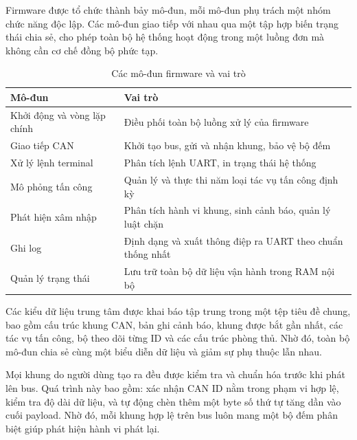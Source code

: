 
Firmware được tổ chức thành bảy mô-đun, mỗi mô-đun phụ trách một nhóm chức năng
độc lập. Các mô-đun giao tiếp với nhau qua một tập hợp biến trạng thái chia sẻ,
cho phép toàn bộ hệ thống hoạt động trong một luồng đơn mà không cần cơ chế đồng
bộ phức tạp.

\begin{table}[H]
\centering
\begin{tabular}{|>{\raggedright\arraybackslash}p{5cm}|>{\raggedright\arraybackslash}p{8.5cm}|}
\hline
\textbf{Mô-đun} & \textbf{Vai trò} \\ \hline
Khởi động và vòng lặp chính & Điều phối toàn bộ luồng xử lý của firmware \\ \hline
Giao tiếp CAN & Khởi tạo bus, gửi và nhận khung, bảo vệ bộ đếm \\ \hline
Xử lý lệnh terminal & Phân tích lệnh UART, in trạng thái hệ thống \\ \hline
Mô phỏng tấn công & Quản lý và thực thi năm loại tác vụ tấn công định kỳ \\ \hline
Phát hiện xâm nhập & Phân tích hành vi khung, sinh cảnh báo, quản lý luật chặn \\ \hline
Ghi log & Định dạng và xuất thông điệp ra UART theo chuẩn thống nhất \\ \hline
Quản lý trạng thái & Lưu trữ toàn bộ dữ liệu vận hành trong RAM nội bộ \\ \hline
\end{tabular}
\caption{Các mô-đun firmware và vai trò}
\end{table}

Các kiểu dữ liệu trung tâm được khai báo tập trung trong một tệp tiêu đề chung, bao
gồm cấu trúc khung CAN, bản ghi cảnh báo, khung được bắt gần nhất, các tác vụ tấn
công, bộ theo dõi từng ID và các cấu trúc phòng thủ. Nhờ đó, toàn bộ mô-đun chia
sẻ cùng một biểu diễn dữ liệu và giảm sự phụ thuộc lẫn nhau.


Mọi khung do người dùng tạo ra đều được kiểm tra và chuẩn hóa trước khi phát lên
bus. Quá trình này bao gồm: xác nhận CAN ID nằm trong phạm vi hợp lệ, kiểm tra độ
dài dữ liệu, và tự động chèn thêm một byte số thứ tự tăng dần vào cuối payload.
Nhờ đó, mỗi khung hợp lệ trên bus luôn mang một bộ đếm phân biệt giúp phát hiện
hành vi phát lại.

